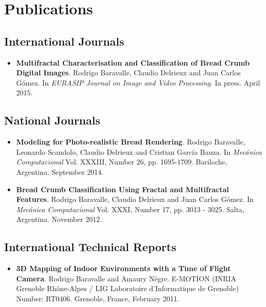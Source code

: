 \documentclass[a4paper,12pt]{article}
\begin{document}
\section*{Publications}
\subsection*{International Journals}

\begin{itemize}
\item {\bf Multifractal Characterisation and Classification of Bread Crumb Digital Images}. Rodrigo Baravalle, Claudio Delrieux and Juan Carlos Gómez. In {\it EURASIP Journal on Image and Video Processing}. In press. April 2015.
\end{itemize}

\subsection*{National Journals}

\begin{itemize}
\item {\bf Modeling for Photo-realistic Bread Rendering}. Rodrigo Baravalle, Leonardo Scandolo, Claudio Delrieux and Cristian García Bauza. In {\it Mecánica Computacional} Vol. XXXIII, Number 26, pp. 1695-1709. Bariloche, Argentina. September 2014.
\item {\bf Bread Crumb Classification Using Fractal and Multifractal Features}. Rodrigo Baravalle, Claudio Delrieux and Juan Carlos G\'omez. In {\it Mecánica Computacional} Vol. XXXI, Number 17, pp. 3013 - 3025. Salta, Argentina. November 2012.
\end{itemize}


\subsection*{International Technical Reports}
\begin{itemize}
\item {\bf 3D Mapping of Indoor Environments with a Time of Flight Camera}. Rodrigo Baravalle and Amaury N\`egre. E-MOTION (INRIA Grenoble Rh\^one-Alpes / LIG Laboratoire d'Informatique de Grenoble) Number: RT0406. Grenoble, France, February 2011.
\end{itemize}
\end{document}
